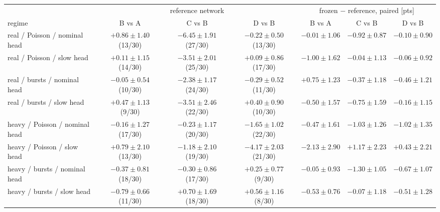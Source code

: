 \begin{tabular}{@{}lccc|ccc@{}}
\toprule
 & \multicolumn{3}{c|}{reference network} & \multicolumn{3}{c}{frozen $-$ reference, paired [pts]} \\
regime & B vs A & C vs B & D vs B & B vs A & C vs B & D vs B \\
\midrule
real / Poisson / nominal head & $+0.86 \pm 1.40$ (13/30) & {\boldmath$-6.45 \pm 1.91$} (27/30) & $-0.22 \pm 0.50$ (13/30) & $-0.01 \pm 1.06$ & {\boldmath$-0.92 \pm 0.87$} & $-0.10 \pm 0.90$ \\
real / Poisson / slow head & $+0.11 \pm 1.15$ (14/30) & {\boldmath$-3.51 \pm 2.01$} (25/30) & $+0.09 \pm 0.86$ (17/30) & $-1.00 \pm 1.62$ & $-0.04 \pm 1.13$ & $-0.06 \pm 0.92$ \\
real / bursts / nominal head & $-0.05 \pm 0.54$ (10/30) & {\boldmath$-2.38 \pm 1.17$} (24/30) & $-0.29 \pm 0.52$ (11/30) & $+0.75 \pm 1.23$ & $-0.37 \pm 1.18$ & $-0.46 \pm 1.21$ \\
real / bursts / slow head & $+0.47 \pm 1.13$ (9/30) & {\boldmath$-3.51 \pm 2.46$} (22/30) & $+0.40 \pm 0.90$ (10/30) & $-0.50 \pm 1.57$ & $-0.75 \pm 1.59$ & $-0.16 \pm 1.15$ \\
heavy / Poisson / nominal head & $-0.16 \pm 1.27$ (17/30) & $-0.23 \pm 1.17$ (20/30) & {\boldmath$-1.65 \pm 1.02$} (22/30) & $-0.47 \pm 1.61$ & $-1.03 \pm 1.26$ & $-1.02 \pm 1.35$ \\
heavy / Poisson / slow head & $+0.79 \pm 2.10$ (13/30) & $-1.18 \pm 2.10$ (19/30) & {\boldmath$-4.17 \pm 2.03$} (21/30) & $-2.13 \pm 2.90$ & $+1.17 \pm 2.23$ & $+0.43 \pm 2.21$ \\
heavy / bursts / nominal head & $-0.37 \pm 0.81$ (18/30) & $-0.30 \pm 0.86$ (17/30) & $+0.25 \pm 0.77$ (9/30) & $-0.05 \pm 0.93$ & {\boldmath$-1.30 \pm 1.05$} & $-0.67 \pm 1.07$ \\
heavy / bursts / slow head & {\boldmath$-0.79 \pm 0.66$} (11/30) & $+0.70 \pm 1.69$ (18/30) & $+0.56 \pm 1.16$ (8/30) & $-0.53 \pm 0.76$ & $-0.07 \pm 1.18$ & $-0.51 \pm 1.28$ \\
\bottomrule
\end{tabular}
